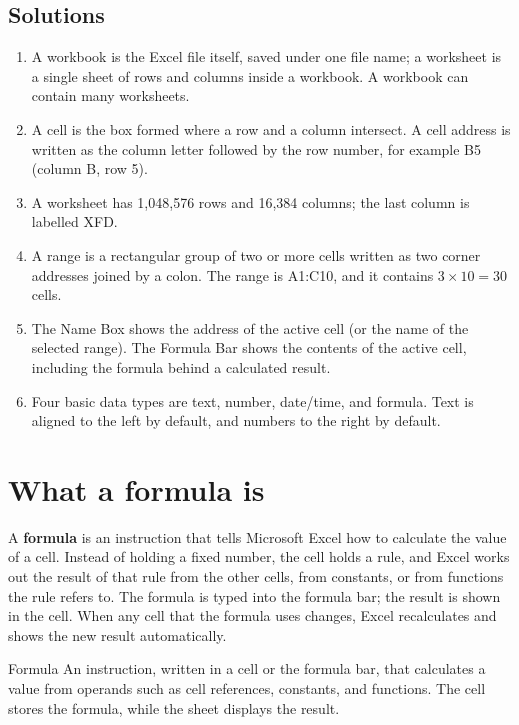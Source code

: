 \subsection*{Solutions}
\begingroup\small
\begin{enumerate}[label=\arabic*.]
  \item A workbook is the Excel file itself, saved under one file name; a
    worksheet is a single sheet of rows and columns inside a workbook. A
    workbook can contain many worksheets.
  \item A cell is the box formed where a row and a column intersect. A cell
    address is written as the column letter followed by the row number, for
    example B5 (column B, row 5).
  \item A worksheet has 1,048,576 rows and 16,384 columns; the last column is
    labelled XFD.
  \item A range is a rectangular group of two or more cells written as two
    corner addresses joined by a colon. The range is A1:C10, and it contains
    $3 \times 10 = 30$ cells.
  \item The Name Box shows the address of the active cell (or the name of the
    selected range). The Formula Bar shows the contents of the active cell,
    including the formula behind a calculated result.
  \item Four basic data types are text, number, date/time, and formula. Text
    is aligned to the left by default, and numbers to the right by default.
\end{enumerate}
\endgroup

\section{What a formula is}
A \textbf{formula} is an instruction that tells Microsoft Excel how to
calculate the value of a cell. Instead of holding a fixed number, the cell
holds a rule, and Excel works out the result of that rule from the other
cells, from constants, or from functions the rule refers to. The formula is
typed into the formula bar; the result is shown in the cell. When any cell
that the formula uses changes, Excel recalculates and shows the new result
automatically.

\begin{definitionbox}{Formula}
An instruction, written in a cell or the formula bar, that calculates a value
from operands such as cell references, constants, and functions. The cell
stores the formula, while the sheet displays the result.
\end{definitionbox}

